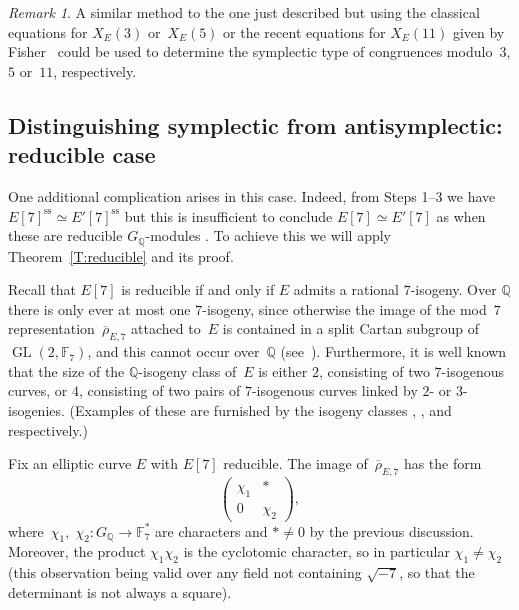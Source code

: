 \documentclass[12pt]{amsart}
\newcommand{\lmfdbeciso}[2]{\href{http://www.lmfdb.org/EllipticCurve/Q/#1/#2}{\text{\rm#1.#2}}}
\newcommand{\F}{\mathbb{F}}
\newcommand{\Q}{\mathbb{Q}}
\newcommand{\rhobar}{{\overline{\rho}}}
\DeclareMathOperator{\sss}{ss}
\newcommand{\GL}{\operatorname{GL}}
\numberwithin{equation}{section}
\theoremstyle{definition}
\theoremstyle{remark}
\newtheorem{remark}[theorem]{Remark}
\begin{document}
\begin{remark}
A similar method to the one just described but using the
classical equations for $X_E(3)$ or~$X_E(5)$ or the recent equations for $X_E(11)$ given by Fisher~\cite{Fisher} 
could be used to determine the symplectic type of 
congruences modulo~$3$, $5$ or~$11$, respectively.
\end{remark}

\subsection{Distinguishing symplectic from antisymplectic: reducible
  case}

One additional complication arises in this case.  
Indeed, from Steps 1--3 we have 
$E[7]^{\sss} \simeq E'[7]^{\sss}$ but this is insufficient to conclude $E[7] \simeq E'[7]$ as when these are reducible $G_\Q$-modules . 
To achieve this we will apply Theorem~\ref{T:reducible} and its proof.

Recall that $E[7]$
is reducible if and only if $E$ admits a rational $7$-isogeny.  Over
$\Q$ there is only ever at most one $7$-isogeny, since otherwise the
image of the mod~$7$ representation~$\rhobar_{E,7}$ attached to~$E$ is contained in
a split Cartan subgroup of $\GL(2,\F_7)$, and this cannot occur
over~$\Q$ (see~\cite[Theorem~1.1]{GL}). 
Furthermore, it is well known that the size of the $\Q$-isogeny class of~$E$ is either $2$, consisting of two $7$-isogenous curves,
or $4$, consisting of two pairs of $7$-isogenous curves linked by
$2$-{} or $3$-isogenies. (Examples of these are furnished by the
isogeny classes \lmfdbeciso{26}{b}, \lmfdbeciso{49}{a}, and
\lmfdbeciso{162}{b} respectively.) 

Fix an elliptic curve $E$ with $E[7]$ reducible. 
The image
of~$\rhobar_{E,7}$ has the form
\[
  \begin{pmatrix}\chi_1&*\\0&\chi_2  \end{pmatrix},
\]
where~$\chi_1, \; \chi_2 : G_{\Q}\to\F_7^*$ are characters  and $* \neq 0$ by the previous discussion. Moreover, the product $\chi_1\chi_2$ is the cyclotomic
character, so in particular $\chi_1\not=\chi_2$ (this observation
being valid over any field not containing $\sqrt{-7}$, so that the
determinant is not always a square).
\end{document}
